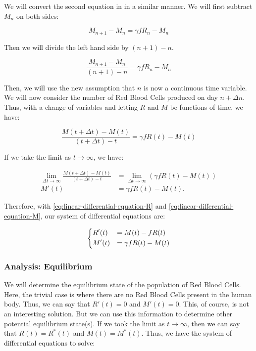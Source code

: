 We will convert the second equation in  in a similar manner. We will first subtract $M_n$ on both sides:

\begin{equation*}
    M_{n+1} - M_n = \gamma fR_n - M_n
\end{equation*}

Then we will divide the left hand side by $(n+1)-n$.

\begin{equation*}
    \frac{M_{n+1} - M_n}{(n+1)-n} = \gamma fR_n - M_n
\end{equation*}

Then, we will use the new assumption that $n$ is now a continuous time variable. We will now consider the number of Red Blood Cells produced on day $n+\Delta n$. Thus, with a change of variables and letting $R$ and $M$ be functions of time, we have:

\begin{equation*}
    \frac{M(t+\Delta t) - M(t)}{(t+\Delta t)-t} = \gamma fR(t) - M(t)
\end{equation*}

If we take the limit as $t\to\infty$, we have:

\begin{align} 
    \lim_{\Delta t \to\infty}\frac{M(t+\Delta t) - M(t)}{(t+\Delta t)-t} &= \lim_{\Delta t \to\infty} (\gamma fR(t) - M(t)) \nonumber\\
    M'(t) &= \gamma fR(t) - M(t).\label{eq:linear-differential-equation-M}
\end{align}

Therefore, with \eqref{eq:linear-differential-equation-R} and \eqref{eq:linear-differential-equation-M}, our system of differential equations are:

\begin{equation}
    \begin{dcases}
        R'(t) &= M(t) - fR(t)\\
        M'(t) &= \gamma fR(t) - M(t)
    \end{dcases}
    \label{eq:linear-differential-model-system}
\end{equation}

\subsubsection{Analysis: Equilibrium}

We will determine the equilibrium state of the population of Red Blood Cells. Here, the trivial case is where there are no Red Blood Cells present in the human body. Thus, we can say that $R'(t) = 0$ and $M'(t) = 0$. This, of course, is not an interesting solution. But we can use this information to determine other potential equilibrium state(s). If we took the limit as $t\to\infty$, then we can say that $R(t) = R^\ast(t)$ and $M(t) = M^\ast(t)$. Thus, we have the system of differential equations to solve:

